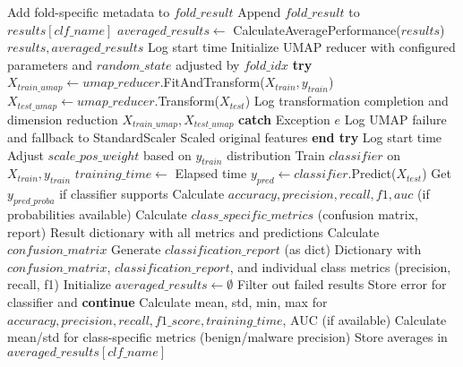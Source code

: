 \begin{algorithm}[!htbp]
\begin{algorithmic}[1]
            \State Add fold-specific metadata to $fold\_result$
            \State Append $fold\_result$ to $results[clf\_name]$
        \EndFor
    \EndFor
    \State $averaged\_results \leftarrow$ CalculateAveragePerformance($results$)
    \Return $results, averaged\_results$
\EndProcedure
\Statex
{}
    \State Log start time
    \State Initialize UMAP reducer with configured parameters and $random\_state$ adjusted by $fold\_idx$
    \State \textbf{try}
        \State $X_{train\_umap} \leftarrow umap\_reducer$.FitAndTransform($X_{train}, y_{train}$)
        \State $X_{test\_umap} \leftarrow umap\_reducer$.Transform($X_{test}$)
        \State Log transformation completion and dimension reduction
        \Return $X_{train\_umap}, X_{test\_umap}$
    \State \textbf{catch} {Exception $e$}
        \State Log UMAP failure and fallback to StandardScaler
        \Return Scaled original features
    \State \textbf{end try}
\EndProcedure
\Statex
{}
    \State Log start time
     Adjust $scale\_pos\_weight$ based on $y_{train}$ distribution \EndIf
    \State Train $classifier$ on $X_{train}, y_{train}$
    \State $training\_time \leftarrow$ Elapsed time
    \State $y_{pred} \leftarrow classifier$.Predict($X_{test}$)
    \State Get $y_{pred\_proba}$ if classifier supports
    \State Calculate $accuracy, precision, recall, f1, auc$ (if probabilities available)
    \State Calculate $class\_specific\_metrics$ (confusion matrix, report)
    \Return Result dictionary with all metrics and predictions
\EndProcedure
\Statex
{}
    \State Calculate $confusion\_matrix$
    \State Generate $classification\_report$ (as dict)
    \Return Dictionary with $confusion\_matrix$, $classification\_report$, and individual class metrics (precision, recall, f1)
\EndProcedure
\Statex
{}
    \State Initialize $averaged\_results \leftarrow \emptyset$
        \State Filter out failed results
         \State Store error for classifier and \textbf{continue} \EndIf
        \State Calculate mean, std, min, max for $accuracy, precision, recall, f1\_score, training\_time$, AUC (if available)
        \State Calculate mean/std for class-specific metrics (benign/malware precision)
        \State Store averages in $averaged\_results[clf\_name]$

\end{algorithmic}
\end{algorithm}
